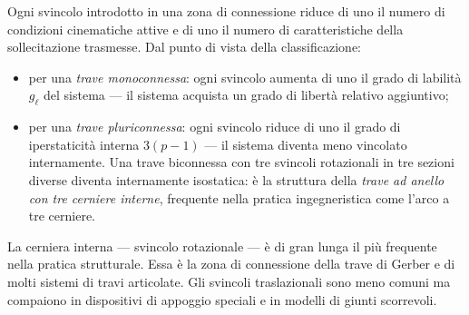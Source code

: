 \begin{oss}
	Ogni svincolo introdotto in una zona di
	connessione riduce di uno il numero di
	condizioni cinematiche attive e di uno il
	numero di caratteristiche della sollecitazione
	trasmesse. Dal punto di vista della
	classificazione:
	\begin{itemize}[nosep]
		\item per una \emph{trave monoconnessa}:
		ogni svincolo aumenta di uno il grado di
		labilità $g_\ell$ del sistema --- il sistema
		acquista un grado di libertà relativo
		aggiuntivo;
		\item per una \emph{trave pluriconnessa}:
		ogni svincolo riduce di uno il grado di
		iperstaticità interna $3(p-1)$ --- il
		sistema diventa meno vincolato internamente.
		Una trave biconnessa con tre svincoli
		rotazionali in tre sezioni diverse diventa
		internamente isostatica: è la struttura
		della \emph{trave ad anello con tre cerniere
			interne}, frequente nella pratica
		ingegneristica come l'arco a tre cerniere.
	\end{itemize}
\end{oss}

\begin{oss}
	La cerniera interna --- svincolo rotazionale
	--- è di gran lunga il più frequente nella
	pratica strutturale. Essa è la zona di
	connessione della trave di Gerber e di molti
	sistemi di travi articolate. Gli svincoli
	traslazionali sono meno comuni ma compaiono
	in dispositivi di appoggio speciali e in
	modelli di giunti scorrevoli.
\end{oss}